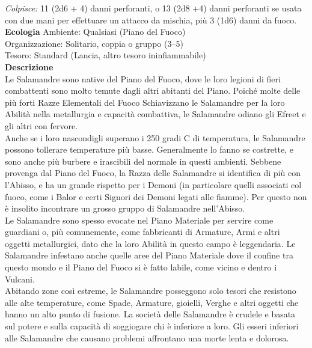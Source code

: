 \begin{multicols}{2}
\emph{Colpisce:} 11 (2d6 + 4) danni perforanti, o 13 (2d8 +4) danni perforanti se usata con due mani per effettuare un attacco da mischia, più 3 (1d6) danni da fuoco.\\
\textbf{Ecologia}
Ambiente: Qualsiasi (Piano del Fuoco)\\
Organizzazione: Solitario, coppia o gruppo (3–5)\\
Tesoro: Standard (Lancia, altro tesoro ininfiammabile)\\
\textbf{Descrizione}\\
Le Salamandre sono native del Piano del Fuoco, dove le loro legioni di fieri combattenti sono molto temute dagli altri abitanti del Piano. Poiché molte delle più forti Razze Elementali del Fuoco Schiavizzano le Salamandre per la loro Abilità nella metallurgia e capacità combattiva, le Salamandre odiano gli Efreet e gli altri con fervore.\\

Anche se i loro nascondigli superano i 250 gradi C di temperatura, le Salamandre possono tollerare temperature più basse. Generalmente lo fanno se costrette, e sono anche più burbere e irascibili del normale in questi ambienti. Sebbene provenga dal Piano del Fuoco, la Razza delle Salamandre si identifica di più con l’Abisso, e ha un grande rispetto per i Demoni (in particolare quelli associati col fuoco, come i Balor e certi Signori dei Demoni legati alle fiamme). Per questo non è insolito incontrare un grosso gruppo di Salamandre nell’Abisso.\\

Le Salamandre sono spesso evocate nel Piano Materiale per servire come guardiani o, più comunemente, come fabbricanti di Armature, Armi e altri oggetti metallurgici, dato che la loro Abilità in questo campo è leggendaria. Le Salamandre infestano anche quelle aree del Piano Materiale dove il confine tra questo mondo e il Piano del Fuoco si è fatto labile, come vicino e dentro i Vulcani.\\

Abitando zone così estreme, le Salamandre posseggono solo tesori che resistono alle alte temperature, come Spade, Armature, gioielli, Verghe e altri oggetti che hanno un alto punto di fusione. La società delle Salamandre è crudele e basata sul potere e sulla capacità di soggiogare chi è inferiore a loro. Gli esseri inferiori alle Salamandre che causano problemi affrontano una morte lenta e dolorosa.\\



\end{multicols}

